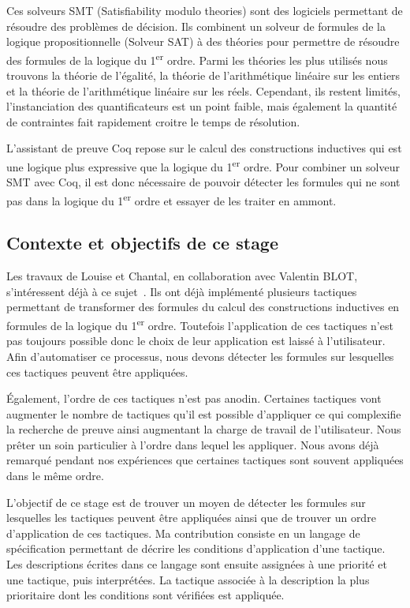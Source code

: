 \documentclass[titlepage,draft]{article}
\begin{document}
Ces solveurs SMT (Satisfiability modulo theories) sont des logiciels permettant de résoudre des problèmes de décision. Ils combinent un solveur de formules de la logique propositionnelle (Solveur SAT) à des théories pour permettre de résoudre des formules de la logique du 1\textsuperscript{er} ordre. Parmi les théories les plus utilisés nous trouvons la théorie de l'égalité, la théorie de l'arithmétique linéaire sur les entiers et la théorie de l'arithmétique linéaire sur les réels. Cependant, ils restent limités, l'instanciation des quantificateurs est un point faible, mais également la quantité de contraintes fait rapidement croitre le temps de résolution.

L'assistant de preuve Coq repose sur le calcul des constructions inductives qui est une logique plus expressive que la logique du 1\textsuperscript{er} ordre. Pour combiner un solveur SMT avec Coq, il est donc nécessaire de pouvoir détecter les formules qui ne sont pas dans la logique du 1\textsuperscript{er} ordre et essayer de les traiter en ammont.

\subsection{Contexte et objectifs de ce stage}
Les travaux de Louise et Chantal, en collaboration avec Valentin BLOT, s'intéressent déjà à ce sujet~\cite{DBLP:journals/corr/abs-2107-02353,DBLP:journals/corr/abs-2204-02643,DBLP:conf/cpp/Blot0CPKMV23}. Ils ont déjà implémenté plusieurs tactiques permettant de transformer des formules du calcul des constructions inductives en formules de la logique du 1\textsuperscript{er} ordre. Toutefois l'application de ces tactiques n'est pas toujours possible donc le choix de leur application est laissé à l'utilisateur. Afin d'automatiser ce processus, nous devons détecter les formules sur lesquelles ces tactiques peuvent être appliquées.

Également, l'ordre de ces tactiques n'est pas anodin. Certaines tactiques vont augmenter le nombre de tactiques qu'il est possible d'appliquer ce qui complexifie la recherche de preuve ainsi augmentant la charge de travail de l'utilisateur. Nous prêter un soin particulier à l'ordre dans lequel les appliquer. Nous avons déjà remarqué pendant nos expériences que certaines tactiques sont souvent appliquées dans le même ordre.

L'objectif de ce stage est de trouver un moyen de détecter les formules sur lesquelles les tactiques peuvent être appliquées ainsi que de trouver un ordre d'application de ces tactiques. Ma contribution consiste en un langage de spécification permettant de décrire les conditions d'application d'une tactique. Les descriptions écrites dans ce langage sont ensuite assignées à une priorité et une tactique, puis interprétées. La tactique associée à la description la plus prioritaire dont les conditions sont vérifiées est appliquée.
\end{document}
